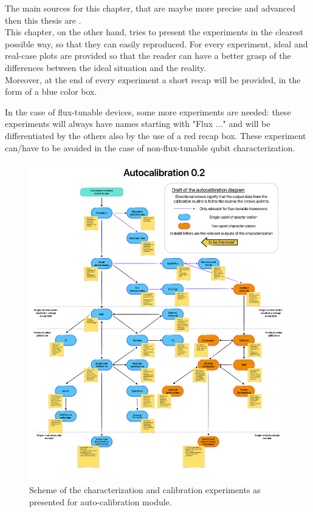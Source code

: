 The main sources for this chapter, that are maybe more precise and advanced then this thesis are \cite{Gao2021, Kim2023, Naghiloo2019, Zijun2018}.\\
This chapter, on the other hand, tries to present the experiments in the clearest possible way, so that they can easily reproduced.
For every experiment, ideal and real-case plots are provided so that the reader can have a better grasp of the differences between the ideal situation and the reality.\\
Moreover, at the end of every experiment a short recap will be provided, in the form of a blue color box.

In the case of flux-tunable devices, some more experiments are needed: these experiments will always have names starting with "Flux ..." and will be differentiated by the others also by the use of a red recap box.
These experiment can/have to be avoided in the case of non-flux-tunable qubit characterization.

\begin{figure}[htbp]
    \centering
    \includegraphics[width=\textwidth]{characterization/figures/Autocalibration 0.2.pdf}
    \caption{Scheme of the characterization and calibration experiments as presented for \Qibocal auto-calibration module.}
    \label{fig:scheme_experiments}
\end{figure}


